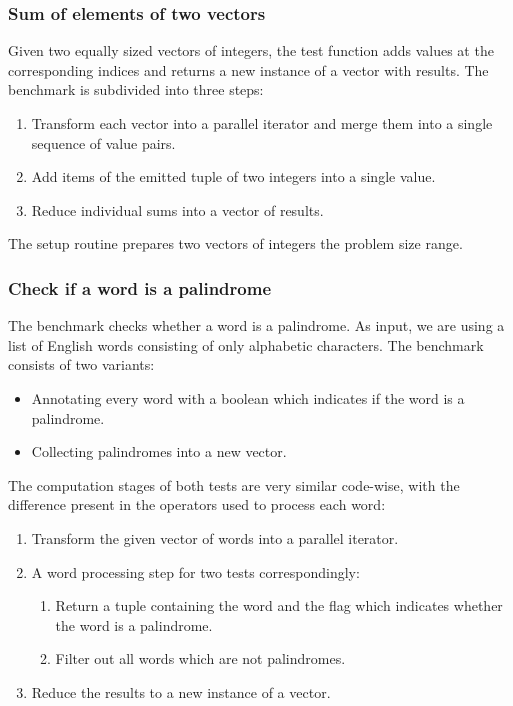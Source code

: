\subsubsection*{Sum of elements of two vectors}
Given two equally sized vectors of integers, the test function adds values at the corresponding indices and returns a new instance of a vector with results. The benchmark is subdivided into three steps:

\begin{enumerate}
    \item Transform each vector into a parallel iterator and merge them into a single sequence of value pairs. 
    \item Add items of the emitted tuple of two integers into a single value.
    \item Reduce individual sums into a vector of results.
\end{enumerate}

The setup routine prepares two vectors of integers the \range{[0, N]} problem size range. 

\subsubsection*{Check if a word is a palindrome}
The benchmark checks whether a word is a palindrome. As input, we are using a list of English words consisting of only alphabetic characters. The benchmark consists of two variants:
\begin{itemize}
    \item Annotating every word with a boolean which indicates if the word is a palindrome. 
    \item Collecting palindromes into a new vector. 
\end{itemize}

The computation stages of both tests are very similar code-wise, with the difference present in the operators used to process each word:

\begin{enumerate}
    \item Transform the given vector of words into a parallel iterator. 
    \item A word processing step for two tests correspondingly:
    \begin{enumerate}
        \item Return a tuple containing the word and the flag which indicates whether the word is a palindrome. 
        \item Filter out all words which are not palindromes. 
    \end{enumerate}
    \item Reduce the results to a new instance of a vector.  
\end{enumerate}

